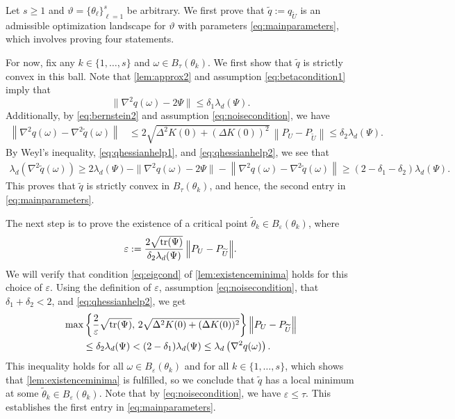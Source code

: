 \documentclass[11pt]{article}
\theoremstyle{definition}
\numberwithin{theorem}{section}
\numberwithin{lemma}{section}
\numberwithin{equation}{section}
\renewcommand{\tilde}{\widetilde}
\renewcommand{\epsilon}{\varepsilon}
\def\trace{{\rm tr}}
\newcommand{\norm}[1]{{\left\|#1\right\|}}
\numberwithin{equation}{section}
\begin{document}
	Let $s\geq 1$ and $\vartheta=\{\theta_\ell\}_{\ell=1}^s$ be arbitrary. We first prove that $\tilde q:=q_{\tilde U}$ is an admissible optimization landscape for $\vartheta$ with parameters \eqref{eq:mainparameters}, which involves proving four statements. 
	
	For now, fix any $k\in \{1,\dots,s\}$ and $\omega \in B_\tau(\theta_k)$. We first show that $\tilde q$ is strictly convex in this ball. Note that \cref{lem:approx2} and assumption \eqref{eq:betacondition1} imply that
	\begin{equation}
		\|\nabla^2 q(\omega) - 2\Psi \| 
		\leq \delta_1 \lambda_d(\Psi). \label{eq:qhessianhelp2}
	\end{equation}
	Additionally, by \eqref{eq:bernstein2} and assumption \eqref{eq:noisecondition}, we have
	\begin{align}\label{eq:qhessianhelp1}
		\norm{\nabla^2 q(\omega)-\nabla^2 \tilde q(\omega)} 
		&\leq 2 \sqrt{ \Delta^2 K(0) + (\Delta K(0))^2} \, \norm{P_U-P_{\tilde U}}
		\leq \delta_2 \lambda_d(\Psi). 
	\end{align}
	By Weyl's inequality, \eqref{eq:qhessianhelp1}, and \eqref{eq:qhessianhelp2}, we see that
	\begin{align*}
		\lambda_d \left( \nabla^2 \tilde q(\omega)\right)
		\geq 2\lambda_d(\Psi) - \|\nabla^2 q(\omega) - 2\Psi \| - \norm{\nabla^2 q(\omega)-\nabla^2 \tilde q(\omega)}
		\geq (2-\delta_1-\delta_2) \lambda_d(\Psi).  
	\end{align*}
	This proves that $\tilde q$ is strictly convex in $B_\tau(\theta_k)$, and hence, the second entry in \eqref{eq:mainparameters}. 

    The next step is to prove the existence of a critical point $\tilde \theta_k \in B_\epsilon(\theta_k)$, where
	$$
	\epsilon := \frac {2\sqrt{\trace(\Psi)}} {\delta_2 \lambda_d(\Psi)} \, \norm{P_U-P_{\tilde U}}.
	$$
	We will verify that condition \eqref{eq:eigcond} of \cref{lem:existenceminima} holds for this choice of $\epsilon$. Using the definition of $\epsilon$, assumption \eqref{eq:noisecondition}, that $\delta_1+\delta_2<2$, and \eqref{eq:qhessianhelp2}, we get 
	\begin{align*}
		&\max\left\{ \frac 2 \epsilon \sqrt{\trace(\Psi)}, \, 2 \sqrt{ \Delta^2 K(0) + (\Delta K(0))^2} \right\} \norm{P_U-P_{\tilde U}} \\
		&\qquad \leq \delta_2 \lambda_d(\Psi)
		< (2-\delta_1) \lambda_d(\Psi)
		\leq \lambda_d\left( \nabla^2 q(\omega)\right). 
	\end{align*}
	This inequality holds for all $\omega\in B_\epsilon(\theta_k)$ and for all $k\in \{1,\dots,s\}$, which shows that \cref{lem:existenceminima} is fulfilled, so we conclude that $\tilde q$ has a local minimum at some $\tilde \theta_k\in B_\epsilon(\theta_k)$. Note that by \eqref{eq:noisecondition}, we have $\epsilon \leq \tau$. This establishes the first entry in \eqref{eq:mainparameters}. 
\end{document}

